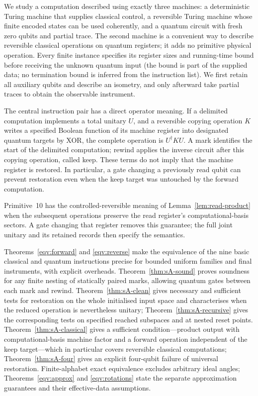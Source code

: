 We study a computation described using exactly three machines: a deterministic Turing machine that supplies classical control, a reversible Turing machine whose finite encoded states can be used coherently, and a quantum circuit with fresh zero qubits and partial trace. The second machine is a convenient way to describe reversible classical operations on quantum registers; it adds no primitive physical operation. Every finite instance specifies its register sizes and running-time bound before receiving the unknown quantum input (the bound is part of the supplied data; no termination bound is inferred from the instruction list). We first retain all auxiliary qubits and describe an isometry, and only afterward take partial traces to obtain the observable instrument.

The central instruction pair has a direct operator meaning. If a delimited computation implements a total unitary $U$, and a reversible copying operation $K$ writes a specified Boolean function of its machine register into designated quantum targets by XOR, the complete operation is $U^\dagger KU$. A mark identifies the start of the delimited computation; rewind applies the inverse circuit after this copying operation, called keep. These terms do not imply that the machine register is restored. In particular, a gate changing a previously read qubit can prevent restoration even when the keep target was untouched by the forward computation.

Primitive~10 has the controlled-reversible meaning of
Lemma~\ref{lem:read-product} when the subsequent operations preserve the
read register's computational-basis sectors. A gate changing that register
removes this guarantee; the full joint unitary and its retained records
then specify the semantics.

Theorems~\ref{eqv:forward} and \ref{eqv:reverse} make the equivalence of the nine basic classical and quantum instructions precise for bounded uniform families and final instruments, with explicit overheads. Theorem~\ref{thm:sA-sound} proves soundness for any finite nesting of statically paired marks, allowing quantum gates between each mark and rewind. Theorem~\ref{thm:sA-clean} gives necessary and sufficient tests for
restoration on the whole initialised input space and characterises when
the reduced operation is nevertheless unitary; Theorem~\ref{thm:sA-recursive}
gives the corresponding tests on specified reached subspaces and at nested
reset points. Theorem~\ref{thm:sA-classical} gives a sufficient condition---product
output with computational-basis machine factor and a forward operation
independent of the keep target---which in particular covers reversible
classical computations; Theorem~\ref{thm:sA-four} gives an explicit four-qubit failure of universal restoration. Finite-alphabet exact equivalence excludes arbitrary ideal angles; Theorems~\ref{eqv:approx} and \ref{eqv:rotations} state the separate approximation guarantees and their effective-data assumptions.

